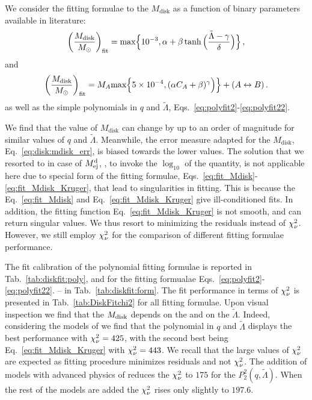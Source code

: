 We consider the fitting formulae to the $M_{\text{disk}}$ as a function of binary parameters 
available in literature: \citep{Radice:2018pdn}
%
\begin{equation}
\left(\frac{M_{\rm{disk}}}{M_{\odot}}\right)_{\rm fit} = \text{max}\Big\{10^{-3}, \alpha + \beta \tanh\Big(\frac{\tilde{\Lambda}-\gamma}{\delta}\Big)\Big\}\,,
\label{eq:fit_Mdisk}
\end{equation}
%
and \citep{Kruger:2020gig}
%
\begin{equation}
\left(\frac{M_{\rm{disk}}}{M_{\odot}}\right)_{\rm fit} =
M_A\text{max}\Big\{5\times 10^{-4}, (\alpha C_A + \beta)^\gamma
\Big)\Big\}
+ (A\leftrightarrow B)\,.
\label{eq:fit_Mdisk_Kruger}
\end{equation}
%
as well as the simple polynomials in $q$ and $\tilde{\Lambda}$, 
Eqs.~\eqref{eq:polyfit2}-\eqref{eq:polyfit22}.


We find that the value of $M_{\text{disk}}$ can change by up to an order of magnitude 
for similar values of $q$ and $\tilde{\Lambda}$. Meanwhile, the error measure adapted for the 
$M_{\text{disk}}$, Eq.~\eqref{eq:disk:mdisk_err}, is biased towards the lower values. 
The solution that we resorted to in case of $M^{\text{d}}_{\text{ej}}$, \ie, to invoke the $\log_{10}$ of the 
quantity, is not applicable here due to special form of the fitting formulae,  
Eqs.~\eqref{eq:fit_Mdisk}-\eqref{eq:fit_Mdisk_Kruger}, that lead to singularities in fitting.
%
This is because the Eq.~\eqref{eq:fit_Mdisk} and Eq.~\eqref{eq:fit_Mdisk_Kruger} give
ill-conditioned fits. In addition, the fitting function Eq.~\eqref{eq:fit_Mdisk_Kruger} 
is not smooth, and can return singular values.
%
We thus resort to minimizing the residuals instead of $\chi_{\nu}^2$. However, we still 
employ $\chi_{\nu}^2$ for the comparison of different fitting formulae performance. 

The fit calibration of the polynomial fitting formulae is reported in 
Tab.~\ref{tab:diskfit:poly}, and for the fitting formualae 
Eqs.~\eqref{eq:polyfit2}-\eqref{eq:polyfit22}. -- in Tab.~\ref{tab:diskfit:form}.
The fit performance in terms of $\chi_{\nu}^2$ is presented in Tab.~\ref{tab:DiskFitchi2} for all
fitting formulae. 
%
Upon visual inspection we find that the $M_{\rm disk}$ depends on the \mr{} 
and on the $\tilde{\Lambda}$. Indeed, considering the models of \DSrefset{} we find 
that the polynomial in $q$ and $\tilde{\Lambda}$ displays the best performance with 
$\chi_{\nu}^2=425$, with the second best being Eq.~\eqref{eq:fit_Mdisk_Kruger} with $\chi_{\nu}^2=443$.
We recall that the large values of $\chi_{\nu}^2$ are expected as fitting procedure minimizes 
residuals and not $\chi_{\nu}^2$.
%
The addition of models with advanced physics of \DSheatcool{} reduces the $\chi_{\nu}^2$ to 
$175$ for the $P_2^2(q,\tilde{\Lambda})$. When the rest of the models are added 
the $\chi_{\nu}^2$ rises only slightly to $197.6$.

